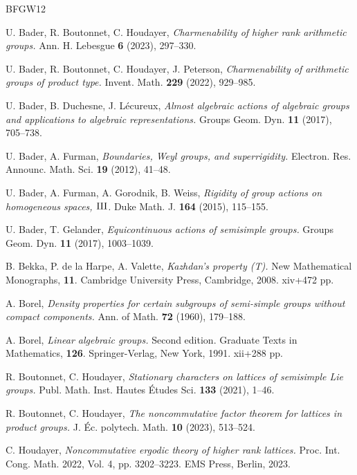 \documentclass[11pt]{amsart}
\numberwithin{equation}{section}
\theoremstyle{plain}
\theoremstyle{definition}
\begin{document}
\begin{thebibliography}{BFGW12}

 {\sc U. Bader, R. Boutonnet, C. Houdayer}, {\it Charmenability of higher rank arithmetic groups.} Ann. H. Lebesgue {\bf 6} (2023), 297--330.

 {\sc U. Bader, R. Boutonnet, C. Houdayer, J. Peterson}, {\it Charmenability of arithmetic groups of product type.} Invent. Math. {\bf 229} (2022), 929--985.

 {\sc U. Bader, B. Duchesne, J. L\'ecureux}, {\it Almost algebraic actions of algebraic groups and applications to algebraic representations.} Groups Geom. Dyn. {\bf 11} (2017), 705--738.

 {\sc U. Bader, A. Furman}, {\it Boundaries, Weyl groups, and superrigidity.} Electron. Res. Announc. Math. Sci. {\bf 19} (2012), 41--48.

 {\sc U. Bader, A. Furman, A. Gorodnik, B. Weiss}, {\it Rigidity of group actions on homogeneous spaces, ${\rm III}$.} Duke Math. J. {\bf 164} (2015), 115--155.  

 {\sc U. Bader, T. Gelander}, {\it Equicontinuous actions of semisimple groups.} Groups Geom. Dyn. {\bf 11} (2017), 1003--1039.

 {\sc B. Bekka, P. de la Harpe, A. Valette}, {\it Kazhdan's property {\em (T)}.} New Mathematical Monographs, {\bf 11}. Cambridge University Press, Cambridge, 2008. xiv+472 pp.

 {\sc A. Borel}, {\it Density properties for certain subgroups of semi-simple groups without compact components.} Ann. of Math. {\bf 72} (1960), 179--188.

 {\sc A. Borel}, {\it Linear algebraic groups.} Second edition. Graduate Texts in Mathematics, {\bf 126}. Springer-Verlag, New York, 1991. xii+288 pp. 

 {\sc R. Boutonnet, C. Houdayer}, {\it Stationary characters on lattices of semisimple Lie groups.} Publ. Math. Inst. Hautes \'Etudes Sci. {\bf 133} (2021), 1--46.

 {\sc R. Boutonnet, C. Houdayer}, {\it The noncommutative factor theorem for lattices in product groups.} J. \'Ec. polytech. Math. {\bf 10} (2023), 513--524.

 {\sc C. Houdayer}, {\it Noncommutative ergodic theory of higher rank lattices.} Proc. Int. Cong. Math. 2022, Vol. 4, pp. 3202--3223. EMS Press, Berlin, 2023. 


\end{thebibliography}
\end{document}
